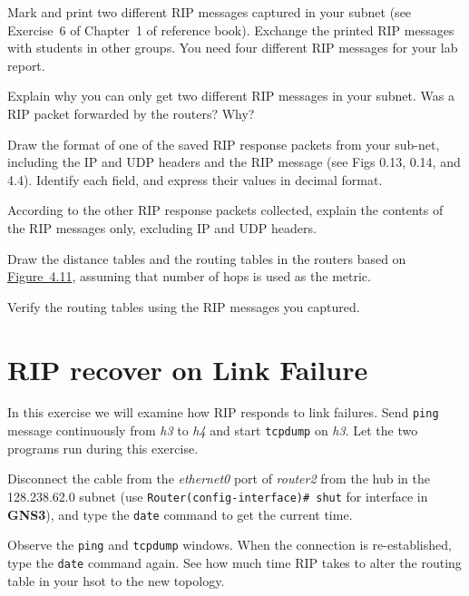 \documentclass{../UTNetLab}
\begin{document}
    Mark and print two different RIP messages captured in your subnet (see Exercise~6 of Chapter~1 of reference book).
    Exchange the printed RIP messages with students in other groups.
    You need four different RIP messages for your lab report.
    
    \begin{report}
        \item Explain why you can only get two different RIP messages in your subnet.
        Was a RIP packet forwarded by the routers?
        Why?
        
        \item Draw the format of one of the saved RIP response packets from your sub-net, including the IP and UDP headers and the RIP message (see Figs 0.13, 0.14, and 4.4).
        Identify each field, and express their values in decimal format.
        
        \item According to the other RIP response packets collected, explain the contents of the RIP messages only, excluding IP and UDP headers.

        
        \item Draw the distance tables and the routing tables in the routers based on \hyperref[fig:4.11]{Figure~4.11}, assuming that number of hops is used as the metric.

        \item Verify the routing tables using the RIP messages you captured.
    \end{report}


\section{RIP recover on Link Failure}
    In this exercise we will examine how RIP responds to link failures.
    Send \lstinline{ping} message continuously from \textit{h3} to \textit{h4} and start \lstinline{tcpdump} on \textit{h3}.
    Let the two programs run during this exercise.

    Disconnect the cable from the \textit{ethernet0} port of \textit{router2} from the hub in the 128.238.62.0 subnet (use \lstinline[language={cisco}]{Router(config-interface)# shut} for interface in \textbf{GNS3}), and type the \lstinline{date} command to get the current time.

    Observe the \lstinline{ping} and \lstinline{tcpdump} windows.
    When the connection is re-established, type the \lstinline{date} command again.
    See how much time RIP takes to alter the routing table in your hsot to the new topology.
\end{document}
